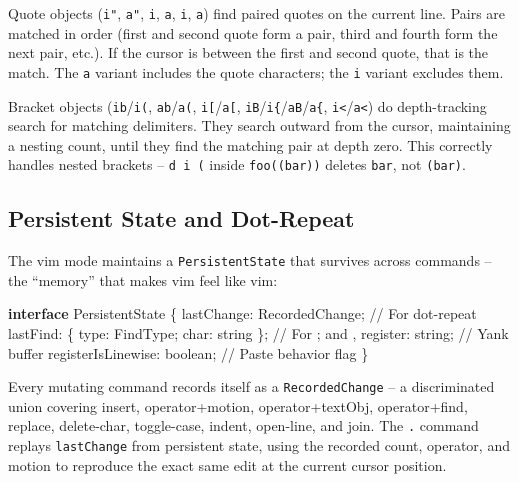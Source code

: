 \documentclass[
  english,
  11pt,
  letterpaper,
]{book}
\newenvironment{Shaded}{\begin{snugshade}}{\end{snugshade}}
\newcommand{\CommentTok}[1]{\textcolor[rgb]{0.37,0.37,0.37}{#1}}
\newcommand{\DataTypeTok}[1]{\textcolor[rgb]{0.68,0.00,0.00}{#1}}
\newcommand{\KeywordTok}[1]{\textcolor[rgb]{0.00,0.23,0.31}{\textbf{#1}}}
\newcommand{\NormalTok}[1]{\textcolor[rgb]{0.00,0.23,0.31}{#1}}
\newcommand{\OperatorTok}[1]{\textcolor[rgb]{0.37,0.37,0.37}{#1}}
\begin{document}
Quote objects (\texttt{i"}, \texttt{a"}, \texttt{i\textquotesingle{}},
\texttt{a\textquotesingle{}}, \texttt{i\textasciigrave{}},
\texttt{a\textasciigrave{}}) find paired quotes on the current line.
Pairs are matched in order (first and second quote form a pair, third
and fourth form the next pair, etc.). If the cursor is between the first
and second quote, that is the match. The \texttt{a} variant includes the
quote characters; the \texttt{i} variant excludes them.

Bracket objects (\texttt{ib}/\texttt{i(}, \texttt{ab}/\texttt{a(},
\texttt{i{[}}/\texttt{a{[}},
\texttt{iB}/\texttt{i\{}/\texttt{aB}/\texttt{a\{},
\texttt{i\textless{}}/\texttt{a\textless{}}) do depth-tracking search
for matching delimiters. They search outward from the cursor,
maintaining a nesting count, until they find the matching pair at depth
zero. This correctly handles nested brackets -- \texttt{d\ i\ (} inside
\texttt{foo((bar))} deletes \texttt{bar}, not \texttt{(bar)}.

\subsection{Persistent State and
Dot-Repeat}\label{persistent-state-and-dot-repeat}

The vim mode maintains a \texttt{PersistentState} that survives across
commands -- the ``memory'' that makes vim feel like vim:

\begin{Shaded}
\begin{Highlighting}[]
\KeywordTok{interface}\NormalTok{ PersistentState \{}
\NormalTok{  lastChange}\OperatorTok{:}\NormalTok{ RecordedChange}\OperatorTok{;}   \CommentTok{// For dot{-}repeat}
\NormalTok{  lastFind}\OperatorTok{:}\NormalTok{ \{ type}\OperatorTok{:}\NormalTok{ FindType}\OperatorTok{;}\NormalTok{ char}\OperatorTok{:} \DataTypeTok{string}\NormalTok{ \}}\OperatorTok{;}  \CommentTok{// For ; and ,}
\NormalTok{  register}\OperatorTok{:} \DataTypeTok{string}\OperatorTok{;}             \CommentTok{// Yank buffer}
\NormalTok{  registerIsLinewise}\OperatorTok{:} \DataTypeTok{boolean}\OperatorTok{;}  \CommentTok{// Paste behavior flag}
\NormalTok{\}}
\end{Highlighting}
\end{Shaded}

Every mutating command records itself as a \texttt{RecordedChange} -- a
discriminated union covering insert, operator+motion, operator+textObj,
operator+find, replace, delete-char, toggle-case, indent, open-line, and
join. The \texttt{.} command replays \texttt{lastChange} from persistent
state, using the recorded count, operator, and motion to reproduce the
exact same edit at the current cursor position.
\end{document}
